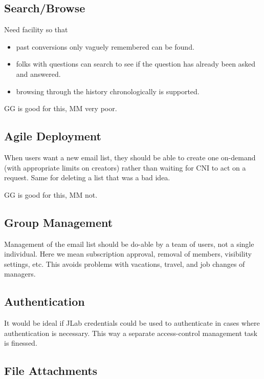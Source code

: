 \documentclass{article}
\begin{document}
\subsection{Search/Browse}

Need facility so that

\begin{itemize}
  
\item past conversions only vaguely remembered can be found.

\item folks with questions can search to see if the question has
  already been asked and answered.

\item browsing through the history chronologically is supported.

\end{itemize}

GG is good for this, MM very poor.

\subsection{Agile Deployment}

When users want a new email list, they should be able to create one
on-demand (with appropriate limits on creators) rather than waiting
for CNI to act on a request. Same for deleting a list that was a bad
idea.

GG is good for this, MM not.

\subsection{Group Management}

Management of the email list should be do-able by a team of users, not
a single individual. Here we mean subscription approval, removal of
members, visibility settings, etc. This avoids problems with
vacations, travel, and job changes of managers.

\subsection{Authentication}

It would be ideal if JLab credentials could be used to authenticate in
cases where authentication is necessary. This way a separate
access-control management task is finessed.

\subsection{File Attachments}
\end{document}
